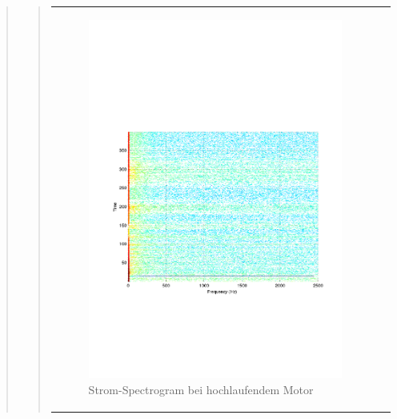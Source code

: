 \begin{quote}
\begin{quote}
\begin{center}
\begin{tabular}{ll}
\begin{minipage}{0.6\textwidth}
                    \end{minipage}
                    \begin{minipage}{0.6\textwidth}
    
                        \begin{figure}[H]
                            \label{fig:}
                            \includegraphics[scale=0.4, trim = 2cm 6cm 1cm
                            7.5cm,
                            clip]{./Bilder/Termin8/fehlerfrei_hochlaufen_Spectrogam.pdf}
                            \caption{Strom-Spectrogram bei hochlaufendem Motor}
                        \end{figure}
                    \vspace{-1.5em}
    
                    \end{minipage}
    

\end{tabular}
\end{center}
\end{quote}
\end{quote}

